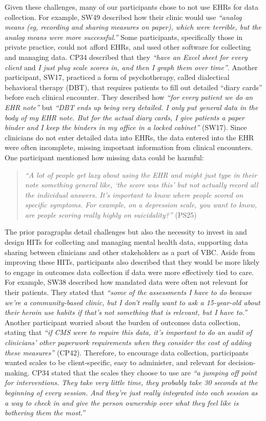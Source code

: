 Given these challenges, many of our participants chose to not use EHRs for data collection.
For example, SW49 described how their clinic would use \textit{``analog means (eg, recording and sharing measures on paper), which were terrible, but the analog means were more successful.''}
Some participants, specifically those in private practice, could not afford EHRs, and used other software for collecting and managing data.
CP34 described that they \textit{``have an Excel sheet for every client} and \textit{I just plug scale scores in, and then I graph them over time''}.
Another participant, SW17, practiced a form of psychotherapy, called dialectical behavioral therapy (DBT), that requires patients to fill out detailed ``diary cards'' before each clinical encounter. 
They described how \textit{``for every patient we do an EHR note''} but \textit{``DBT ends up being very detailed. I only put general data in the body of my EHR note. But for the actual diary cards, I give patients a paper binder and I keep the binders in my office in a locked cabinet''} (SW17).
Since clinicians do not enter detailed data into EHRs, the data entered into the EHR were often incomplete, missing important information from clinical encounters.
One participant mentioned how missing data could be harmful:

\begin{quote}
    \textit{``A lot of people get lazy about using the EHR and might just type in their note something general like, `the score was this' but not actually record all the individual answers.
    It's important to know where people scored on specific symptoms. 
    For example, on a depression scale, you want to know, are people scoring really highly on suicidality?''} (PS25)
\end{quote}

The prior paragraphs detail challenges but also the necessity to invest in and design HITs for collecting and managing mental health data, supporting data sharing between clinicians and other stakeholders as a part of VBC.
Aside from improving these HITs, participants also described that they would be more likely to engage in outcomes data collection if data were more effectively tied to care.
For example, SW38 described how mandated data were often not relevant for their patients.
They stated that \textit{``some of the assessments I have to do because we're a community-based clinic, but I don't really want to ask a 15-year-old about their heroin use habits if that's not something that is relevant, but I have to.''}
Another participant worried about the burden of outcomes data collection, stating that \textit{``if CMS were to require this data, it's important to do an audit of clinicians' other paperwork requirements when they consider the cost of adding these measures''} (CP42).
Therefore, to encourage data collection, participants wanted scales to be client-specific, easy to administer, and relevant for decision-making.
CP34 stated that the scales they choose to use are \textit{``a jumping off point for interventions. They take very little time, they probably take 30 seconds at the beginning of every session. And they're just really integrated into each session as a way to check in and give the person ownership over what they feel like is bothering them the most.''}


